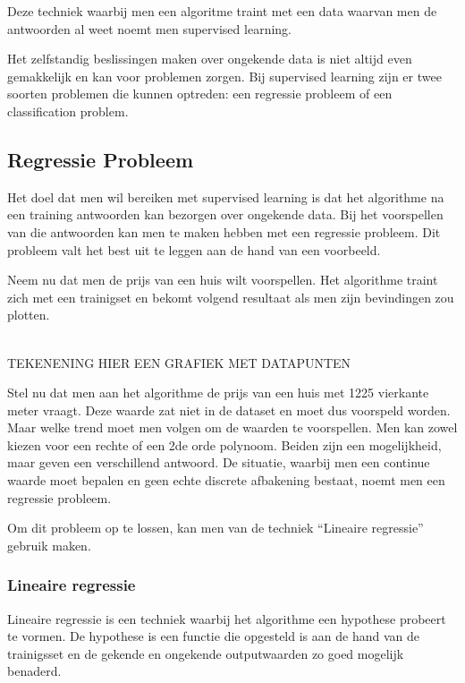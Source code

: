 Deze techniek waarbij men een algoritme traint met een data waarvan men de antwoorden al weet noemt men supervised learning.

Het zelfstandig beslissingen maken over ongekende data is niet altijd even gemakkelijk en kan voor problemen zorgen. 
Bij supervised learning zijn er twee soorten problemen die kunnen optreden: een regressie probleem of een classification problem.

\subsection{Regressie Probleem}\label{Regressie Probleem}

Het doel dat men wil bereiken met supervised learning is dat het algorithme na een training antwoorden kan bezorgen over ongekende data. Bij het voorspellen van die antwoorden kan men te maken hebben met een regressie probleem. Dit probleem valt het best uit te leggen aan de hand van een voorbeeld.

Neem nu dat men de prijs van een huis wilt voorspellen.
Het algorithme traint zich met een trainigset en bekomt volgend resultaat als men zijn bevindingen zou plotten.

\\
TEKENENING HIER EEN GRAFIEK MET DATAPUNTEN 
\newline

Stel nu dat men aan het algorithme de prijs van een huis met 1225 vierkante meter vraagt. Deze waarde zat niet in de dataset en moet dus voorspeld worden. Maar welke trend moet men volgen om de waarden te voorspellen. Men kan zowel kiezen voor een rechte of een 2de orde polynoom. Beiden zijn een mogelijkheid, maar geven een verschillend antwoord. De situatie, waarbij men een continue waarde moet bepalen en geen echte discrete afbakening bestaat, noemt men een regressie probleem.

Om dit probleem op te lossen, kan men van de techniek ``Lineaire regressie'' gebruik maken.

\subsubsection{Lineaire regressie}\label{Lineaire regressie}

Lineaire regressie is een techniek waarbij het algorithme een hypothese probeert te vormen. De hypothese is een functie die opgesteld is aan de hand van de trainigsset en de gekende en ongekende outputwaarden zo goed mogelijk benaderd.

